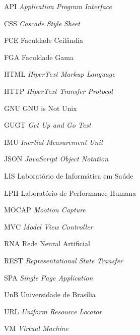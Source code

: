\begin{siglas}
	\item[API] \emph{Application Program Interface}
	\item[CSS] \emph{Cascade Style Sheet}
	\item[FCE] Faculdade Ceilândia 
	\item[FGA] Faculdade Gama
	\item[HTML] \emph{HiperText Markup Language}
	\item[HTTP] \emph{HiperText Transfer Protocol}
	\item[GNU] GNU is Not Unix
	\item[GUGT] \emph{Get Up and Go Test}
	\item[IMU] \emph{Inertial Measurement Unit}
	\item[JSON] \emph{JavaScript Object Notation} 
	\item[LIS] Laboratório de Informática em Saúde
	\item[LPH] Laboratório de Performance Humana
	\item[MOCAP] \emph{Mootion Capture}
	\item[MVC] \emph{Model View Controller}
	\item[RNA] Rede Neural Artificial
	\item[REST] \emph{Representational State Transfer}
	\item[SPA] \emph{Single Page Application}
	\item[UnB] Universidade de Brasília
	\item[URL] \emph{Uniform Resource Locator}
	\item[VM] \emph{Virtual Machine}


\end{siglas}
